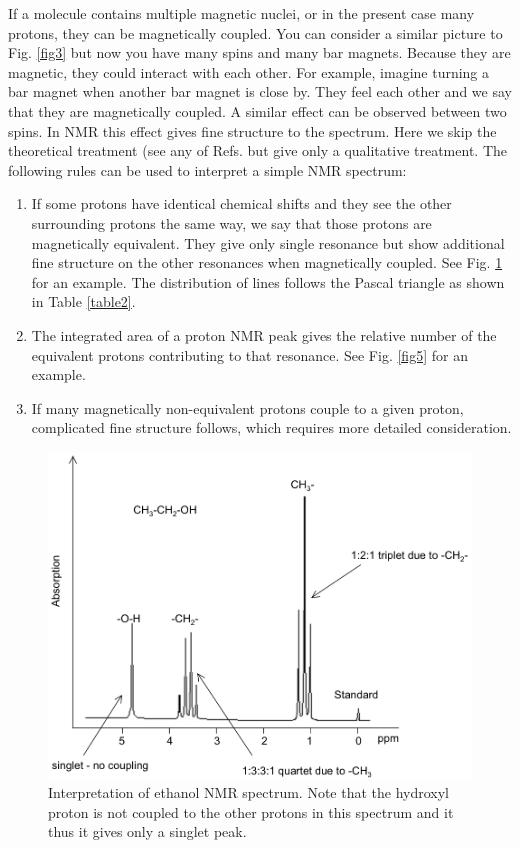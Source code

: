 \documentclass[byrevtex,amssymb,aps,pra,floatfix,letterpaper]{revtex4}
\begin{document}
If a molecule contains multiple magnetic nuclei, or in the present case many protons, they can be magnetically coupled. You can consider a similar picture to Fig. \ref{fig3} but now you have many spins and many bar magnets. Because they are magnetic, they could interact with each other. For example, imagine turning a bar magnet when another bar magnet is close by. They feel each other and we say that they are magnetically coupled. A similar effect can be observed between two spins. In NMR this effect gives fine structure to the spectrum. Here we skip the theoretical treatment (see any of Refs. \cite{ATKINS1,GUNTHER,WERTZ} but give only a qualitative treatment. The following rules can be used to interpret a simple NMR spectrum:

\begin{enumerate}
\item If some protons have identical chemical shifts and they see the other surrounding protons the same way, we say that those protons are magnetically equivalent. They give only single resonance but show additional fine structure on the other resonances when magnetically coupled. See Fig. \ref{fig4} for an example. The distribution of lines follows the Pascal triangle as shown in Table \ref{table2}.
\item The integrated area of a proton NMR peak gives the relative number of the equivalent protons contributing to that resonance. See Fig. \ref{fig5} for an example.
\item If many magnetically non-equivalent protons couple to a given proton, complicated fine structure follows, which requires more detailed consideration.
\end{enumerate}

\begin{figure}[!htp]
\begin{center}
\includegraphics[scale=0.5]{fig4}
\caption{Interpretation of ethanol NMR spectrum. Note that the hydroxyl proton is not coupled to the other protons in this spectrum and it thus it gives only a singlet peak.}
\label{fig4}
\end{center}
\end{figure}
\end{document}
